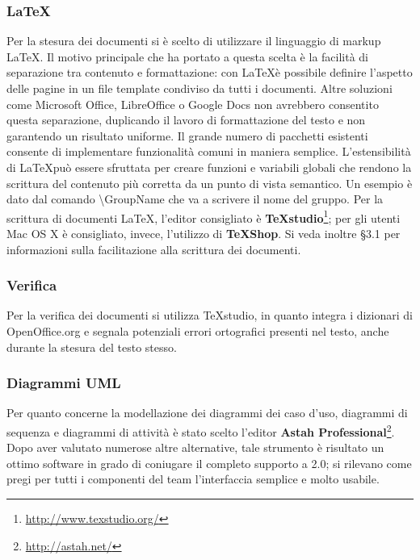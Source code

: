 \subsubsection{\LaTeX}
Per la stesura dei documenti si è scelto di utilizzare il linguaggio di markup \LaTeX. Il motivo principale che ha portato a questa scelta è la facilità di separazione tra contenuto e formattazione: con \LaTeX è possibile definire l'aspetto delle pagine in un file template condiviso da tutti i documenti. Altre soluzioni come Microsoft Office, LibreOffice o Google Docs non avrebbero consentito questa separazione, duplicando il lavoro di formattazione del testo e non garantendo un risultato uniforme. Il grande numero di pacchetti esistenti consente di implementare funzionalità comuni in maniera semplice. L'estensibilità di \LaTeX può essere sfruttata per creare funzioni e variabili globali che rendono la scrittura del contenuto più corretta da un punto di
vista semantico. Un esempio è dato dal comando \textbackslash GroupName che va a scrivere il nome del gruppo. Per la scrittura di documenti \LaTeX, l'editor consigliato è \textbf{TeXstudio}\footnote[2]{\url{http://www.texstudio.org/}}; per gli utenti Mac OS X è consigliato, invece, l'utilizzo di \textbf{TeXShop}. Si veda inoltre §3.1 per informazioni sulla facilitazione alla scrittura dei documenti.

\subsubsection{Verifica}
Per la verifica dei documenti si utilizza TeXstudio, in quanto integra i dizionari di OpenOffice.org e segnala potenziali errori ortografici presenti nel testo, anche durante la stesura del testo stesso.

\subsubsection{Diagrammi UML}

Per quanto concerne la modellazione dei diagrammi dei caso d'uso, diagrammi di sequenza e diagrammi di attività è stato scelto l'editor \textbf{Astah Professional}\footnote[3]{\url{http://astah.net/}}. Dopo aver valutato numerose altre alternative, tale strumento è risultato un ottimo software in grado di coniugare il completo supporto a  2.0; si rilevano come pregi per tutti i componenti del team l'interfaccia semplice e molto usabile.

